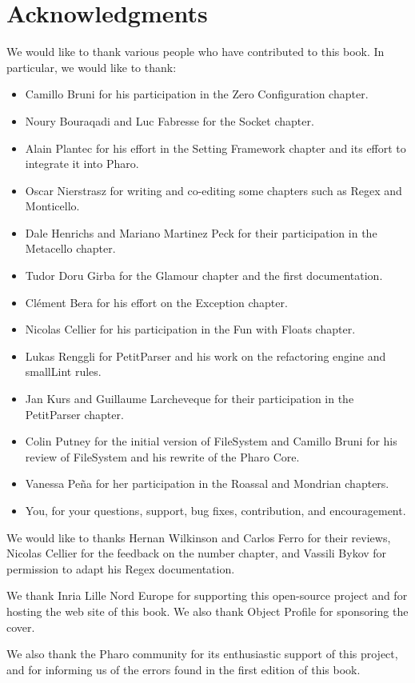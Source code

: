 \documentclass[a4paper,10pt,twoside]{book}
\begin{document}
\section*{Acknowledgments}

We would like to thank various people who have contributed to this book. In particular, we would like to thank:
\begin{itemize}
\item Camillo Bruni for his participation in the Zero Configuration chapter.
\item Noury Bouraqadi and Luc Fabresse for the Socket chapter.
\item Alain Plantec for his effort in the Setting Framework chapter and its effort to integrate it into Pharo.
\item Oscar Nierstrasz for writing and co-editing some chapters such as Regex and Monticello.
\item Dale Henrichs and Mariano Martinez Peck for their participation in the Metacello chapter.
\item Tudor Doru Girba for the Glamour chapter and the first documentation.
\item Cl\'ement Bera for his effort on the Exception chapter.
\item Nicolas Cellier for his participation in the Fun with Floats chapter.
\item Lukas Renggli for PetitParser and his work on the refactoring engine and smallLint rules. 
\item Jan Kurs and Guillaume Larcheveque for their participation in the PetitParser chapter.
\item Colin Putney for the initial version of FileSystem and Camillo Bruni for his review of FileSystem and his rewrite of the Pharo Core.
\item Vanessa Pe\~na for her participation in the Roassal and Mondrian chapters.
\item You, for your questions, support, bug fixes, contribution, and encouragement.
\end{itemize}

We would like to thanks Hernan Wilkinson and Carlos Ferro for their reviews, Nicolas Cellier for the feedback on the number chapter, and Vassili Bykov for permission to adapt his Regex documentation.

We thank Inria Lille Nord Europe for supporting this open-source project and for hosting the web site of this book. We also thank Object Profile for sponsoring the cover.

We also thank the Pharo community for its enthusiastic support of this project, and for informing us of the errors found in the first edition of this book.



\ifx\wholebook\relax\else
   
   
\end{document}
